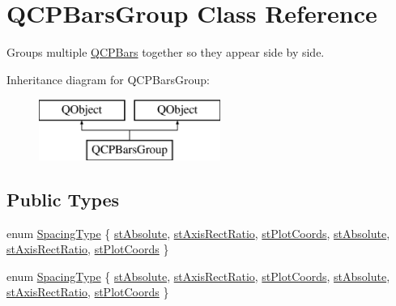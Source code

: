 \hypertarget{class_q_c_p_bars_group}{}\section{Q\+C\+P\+Bars\+Group Class Reference}
\label{class_q_c_p_bars_group}


Groups multiple \hyperlink{class_q_c_p_bars}{Q\+C\+P\+Bars} together so they appear side by side.  


Inheritance diagram for Q\+C\+P\+Bars\+Group\+:\begin{figure}[H]
\begin{center}
\leavevmode
\includegraphics[height=2.000000cm]{class_q_c_p_bars_group}
\end{center}
\end{figure}
\subsection*{Public Types}
\begin{DoxyCompactItemize}
\item 
enum \hyperlink{class_q_c_p_bars_group_a4c0521120a97e60bbca37677a37075b6}{Spacing\+Type} \{ \newline
\hyperlink{class_q_c_p_bars_group_a4c0521120a97e60bbca37677a37075b6a65894b0f2b8249ebca289296fea7297d}{st\+Absolute}, 
\hyperlink{class_q_c_p_bars_group_a4c0521120a97e60bbca37677a37075b6a7b43366bb86f2ea96acb884f107c4728}{st\+Axis\+Rect\+Ratio}, 
\hyperlink{class_q_c_p_bars_group_a4c0521120a97e60bbca37677a37075b6a73baa3f808dc74956073b8bb2eec391d}{st\+Plot\+Coords}, 
\hyperlink{class_q_c_p_bars_group_a4c0521120a97e60bbca37677a37075b6a65894b0f2b8249ebca289296fea7297d}{st\+Absolute}, 
\newline
\hyperlink{class_q_c_p_bars_group_a4c0521120a97e60bbca37677a37075b6a7b43366bb86f2ea96acb884f107c4728}{st\+Axis\+Rect\+Ratio}, 
\hyperlink{class_q_c_p_bars_group_a4c0521120a97e60bbca37677a37075b6a73baa3f808dc74956073b8bb2eec391d}{st\+Plot\+Coords}
 \}
\item 
enum \hyperlink{class_q_c_p_bars_group_a4c0521120a97e60bbca37677a37075b6}{Spacing\+Type} \{ \newline
\hyperlink{class_q_c_p_bars_group_a4c0521120a97e60bbca37677a37075b6a65894b0f2b8249ebca289296fea7297d}{st\+Absolute}, 
\hyperlink{class_q_c_p_bars_group_a4c0521120a97e60bbca37677a37075b6a7b43366bb86f2ea96acb884f107c4728}{st\+Axis\+Rect\+Ratio}, 
\hyperlink{class_q_c_p_bars_group_a4c0521120a97e60bbca37677a37075b6a73baa3f808dc74956073b8bb2eec391d}{st\+Plot\+Coords}, 
\hyperlink{class_q_c_p_bars_group_a4c0521120a97e60bbca37677a37075b6a65894b0f2b8249ebca289296fea7297d}{st\+Absolute}, 
\newline
\hyperlink{class_q_c_p_bars_group_a4c0521120a97e60bbca37677a37075b6a7b43366bb86f2ea96acb884f107c4728}{st\+Axis\+Rect\+Ratio}, 
\hyperlink{class_q_c_p_bars_group_a4c0521120a97e60bbca37677a37075b6a73baa3f808dc74956073b8bb2eec391d}{st\+Plot\+Coords}
 \}
\end{DoxyCompactItemize}

